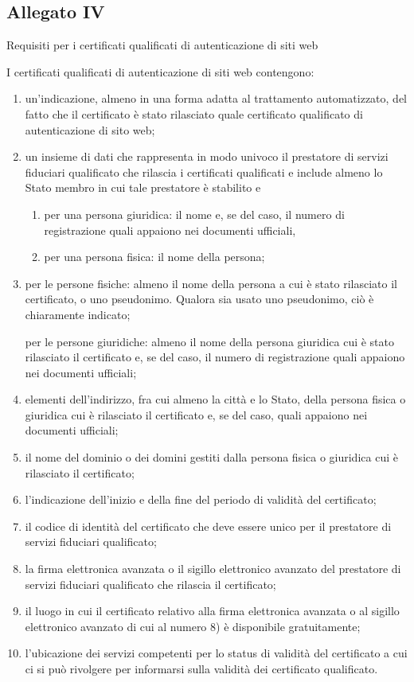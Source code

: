 \subsection*{Allegato IV}\label{sec:allegatoIVreg9102014}
Requisiti per i certificati qualificati di autenticazione di siti web\par 
I certificati qualificati di autenticazione di siti web contengono:
\begin{enumerate}
	\item un’indicazione, almeno in una forma adatta al trattamento automatizzato, del fatto che il certificato è stato rilasciato quale certificato qualificato di autenticazione di sito web;
	\item un insieme di dati che rappresenta in modo univoco il prestatore di servizi fiduciari qualificato che rilascia i certificati qualificati e include almeno lo Stato membro in cui tale prestatore è stabilito e
	\begin{enumerate}
		\item per una persona giuridica: il nome e, se del caso, il numero di registrazione quali appaiono nei documenti ufficiali,
		\item 	
		per una persona fisica: il nome della persona;
	\end{enumerate}
\item per le persone fisiche: almeno il nome della persona a cui è stato rilasciato il certificato, o uno pseudonimo. Qualora sia usato uno pseudonimo, ciò è chiaramente indicato;

per le persone giuridiche: almeno il nome della persona giuridica cui è stato rilasciato il certificato e, se del caso, il numero di registrazione quali appaiono nei documenti ufficiali;
\item elementi dell’indirizzo, fra cui almeno la città e lo Stato, della persona fisica o giuridica cui è rilasciato il certificato e, se del caso, quali appaiono nei documenti ufficiali;
\item il nome del dominio o dei domini gestiti dalla persona fisica o giuridica cui è rilasciato il certificato;
\item 	
l’indicazione dell’inizio e della fine del periodo di validità del certificato;
\item 	
il codice di identità del certificato che deve essere unico per il prestatore di servizi fiduciari qualificato;
\item la firma elettronica avanzata o il sigillo elettronico avanzato del prestatore di servizi fiduciari qualificato che rilascia il certificato;
\item 	
il luogo in cui il certificato relativo alla firma elettronica avanzata o al sigillo elettronico avanzato di cui al numero 8) è disponibile gratuitamente;
\item 	
l’ubicazione dei servizi competenti per lo status di validità del certificato a cui ci si può rivolgere per informarsi sulla validità dei certificato qualificato.
\end{enumerate}
